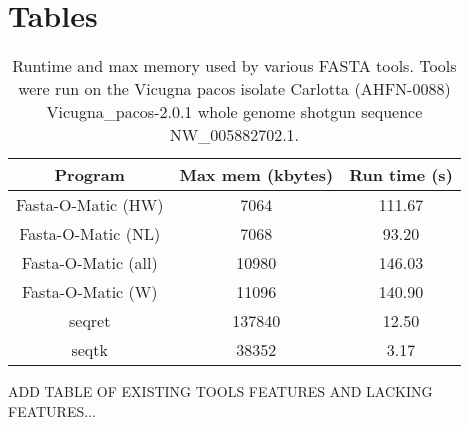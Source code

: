 \section*{Tables}
\begin{table} 
    \begin{tabular}{ c c c }
        Program & Max mem (kbytes) & Run time (s) \\ \hline
        Fasta-O-Matic (HW) & 7064 & 111.67 \\ 
        Fasta-O-Matic (NL) & 7068 & 93.20 \\ 
        Fasta-O-Matic (all) & 10980 & 146.03 \\ 
        Fasta-O-Matic (W) & 11096 & 140.90 \\ 
        seqret & 137840 & 12.50 \\ 
        seqtk & 38352 & 3.17 \\ 
    \end{tabular} 
    \caption{Runtime and max memory used by various FASTA tools. Tools were run on the Vicugna pacos isolate Carlotta (AHFN-0088) Vicugna_pacos-2.0.1 whole genome shotgun sequence NW_005882702.1.} 
\end{table}

ADD TABLE OF EXISTING TOOLS FEATURES AND LACKING FEATURES...

  
  
  
  
  
  
